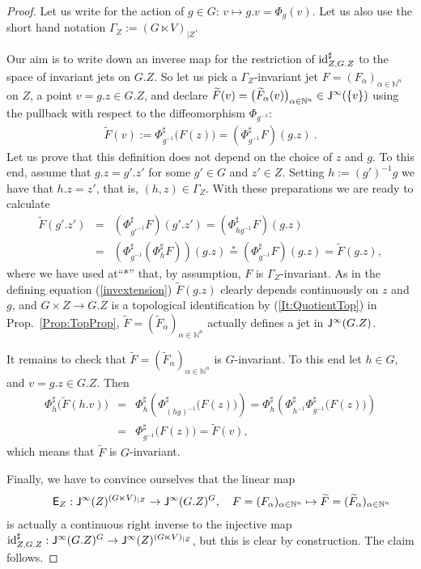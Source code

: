 \begin{proof} Let us write for the action of $g\in G$: $v\mapsto g.v=\Phi_g(v)$. Let us also use the short 
hand notation $\Gamma_Z:= (G\ltimes V)_{|Z}$.

Our aim is to write down an inverse map for the restriction of $\operatorname{id}^{\sharp}_{Z,G.Z}$ to the space of invariant 
jets on $G.Z$. So let us pick a $\Gamma_Z$-invariant jet $F=(F_\alpha)_{\alpha\in \mathbb N^n}$ on $Z$, a point 
$v=g.z\in G.Z$, and declare 
$\widetilde F (v) = \big( \widetilde F_{\alpha} (v)\big)_{\alpha\in \mathbb N^n}  \in \mathsf{J}^\infty(\{v\})$ 
using the pullback with respect to the diffeomorphism $\Phi_{g^{-1}}$:
\begin{eqnarray}\label{invextension}
\widetilde F(v) :=\Phi^{\sharp}_{g^{-1}} \big(  F ( z) \big) = (\Phi^{\sharp}_{g^{-1}} F)(g.z) \: .
\end{eqnarray}
Let us prove that this definition does not depend on the choice of $z$ and $g$.
To this end, assume that $g.z=g'.z'$ for some $g'\in G$ and $z'\in Z$. Setting $h:=(g')^{-1}g$ we have that $h.z=z'$, that is, $(h,z)\in\Gamma_Z$. With these preparations we are ready to calculate
\begin{eqnarray*}
\widetilde F(g'.z')&=&(\Phi^{\sharp}_{g'^{-1}} F)(g'.z')=(\Phi^{\sharp}_{hg^{-1}} F)(g.z)\\
&=&\left(\Phi^{\sharp}_{g^{-1}}(\Phi^{\sharp}_{h}F)\right)(g.z)\stackrel{*}{=}(\Phi^{\sharp}_{g^{-1}}F)(g.z)=\widetilde F(g.z),
\end{eqnarray*}
where we have used at``$*$'' that, by assumption, $F$ is $\Gamma_Z$-invariant.
As in the defining equation (\ref{invextension}) $\widetilde F (g.z)$ clearly depends continuously on 
$z$ and $g$, and $G\times Z \rightarrow G.Z$ is a topological identification by (\ref{It:QuotientTop}) in 
Prop.~\ref{Prop:TopProp},
$\widetilde F=(\widetilde F_{\alpha})_{\alpha\in \mathbb N^n}$  actually defines a jet in $\mathsf{J}^\infty(G.Z)$.

It remains to check that $\widetilde F=(\widetilde F_{\alpha})_{\alpha\in \mathbb N^n}$ is $G$-invariant. 
To this end let $h \in G$, and $v =g.z\in G.Z$. Then 
\begin{eqnarray*}
\Phi^{\sharp}_{h} \big( \widetilde F(h.v) \big) &=& \Phi^{\sharp}_{h} \left( \Phi^{\sharp}_{(hg)^{-1}} \big( F (z)\big)\right) 
= \Phi^{\sharp}_{h} \left( \Phi^{\sharp}_{h^{-1}}\Phi^{\sharp}_{g^{-1}} \big( F (z) \big) \right) \\
&=& \Phi^{\sharp}_{g^{-1}} \big( F (z) \big)=  \widetilde F(v) ,
\end{eqnarray*}
which means that $ \widetilde F$ is $G$-invariant. 

Finally, we have to convince ourselves that the linear map 
\begin{eqnarray}
\qquad\mathsf{E}_Z : \mathsf{J}^\infty(Z)^{(G \ltimes V)_{|Z}}\to \mathsf{J}^\infty(G.Z)^G,\quad 
  F=(F_\alpha)_{\alpha\in \mathbb N^n}\mapsto\widetilde F=(\widetilde F_{\alpha})_{\alpha\in \mathbb N^n}
\end{eqnarray} 
is actually a  continuous right inverse to the injective map 
$\operatorname{id}^{\sharp}_{Z,G.Z}: \mathsf{J}^\infty(G.Z)^G\to \mathsf{J}^\infty(Z)^{(G \ltimes V)_{|Z}}$, but this is clear by construction.
The claim follows.
\end{proof} 
